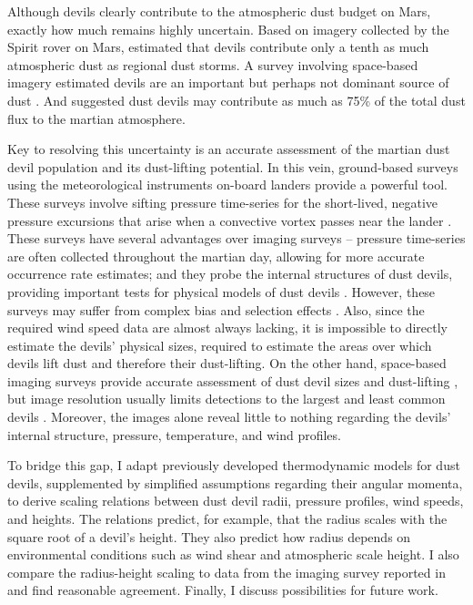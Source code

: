 \documentclass{aastex63}
\begin{document}
Although devils clearly contribute to the atmospheric dust budget on Mars, exactly how much remains highly uncertain. Based on imagery collected by the Spirit rover on Mars, \citet{2006JGRE..11112S09G} estimated that devils contribute only a tenth as much atmospheric dust as regional dust storms. A survey involving space-based imagery estimated devils are an important but perhaps not dominant source of dust \citep{2006JGRE..11112002C}. And \citet{2016SSRv..203...89F} suggested dust devils may contribute as much as 75\% of the total dust flux to the martian atmosphere. 

Key to resolving this uncertainty is an accurate assessment of the martian dust devil population and its dust-lifting potential. In this vein, ground-based surveys using the meteorological instruments on-board landers provide a powerful tool. These surveys involve sifting pressure time-series for the short-lived, negative pressure excursions that arise when a convective vortex passes near the lander \citep[e.g.][]{Ellehoj_2010, 2018Icar..299..308O}. These surveys have several advantages over imaging surveys -- pressure time-series are often collected throughout the martian day, allowing for more accurate occurrence rate estimates; and they probe the internal structures of dust devils, providing important tests for physical models of dust devils \citep{2000JGR...105.1859R}. However, these surveys may suffer from complex bias and selection effects \citep{2018Icar..299..166J}. Also, since the required wind speed data are almost always lacking, it is impossible to directly estimate the devils' physical sizes, required to estimate the areas over which devils lift dust and therefore their dust-lifting. On the other hand, space-based imaging surveys provide accurate assessment of dust devil sizes and dust-lifting \citep{2006JGRE..11112002C}, but image resolution usually limits detections to the largest and least common devils \citep{2009Icar..203..683L}. Moreover, the images alone reveal little to nothing regarding the devils' internal structure, pressure, temperature, and wind profiles.

To bridge this gap, I adapt previously developed thermodynamic models for dust devils, supplemented by simplified assumptions regarding their angular momenta, to derive scaling relations between dust devil radii, pressure profiles, wind speeds, and heights. The relations predict, for example, that the radius scales with the square root of a devil's height. They also predict how radius depends on environmental conditions such as wind shear and atmospheric scale height. I also compare the radius-height scaling to data from the imaging survey reported in \citet{2008Icar..197...39S} and find reasonable agreement. Finally, I discuss possibilities for future work.
\end{document}
